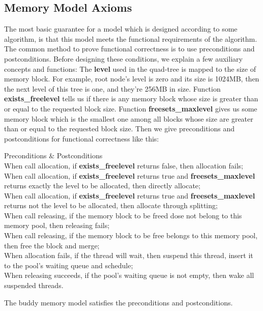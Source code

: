 \documentclass[runningheads]{llncs}
\begin{document}
\subsection{Memory Model Axioms}
The most basic guarantee for a model which is designed according to some algorithm, is that this model meets the functional requirements of the algorithm. The common method to prove functional correctness is to use preconditions and postconditions. Before designing these conditions, we explain a few auxiliary concepts and functions: The \textbf{level} used in the quad-tree is mapped to the size of memory block. For example, root node's level is zero and its size is 1024MB, then the next level of this tree is one, and they're 256MB in size. Function \textbf{exists\_freelevel} tells us if there is any memory block whose size is greater than or equal to the requested block size. Function \textbf{freesets\_maxlevel} gives us some memory block which is the smallest one among all blocks whose size are greater than or equal to the requested block size. Then we give preconditions and postconditions for functional correctness like this:

\begin{definition} {Preconditions $\&$ Postconditions} \\
When call allocation, if \textbf{exists\_freelevel} returns false, then allocation fails; \\
When call allocation, if \textbf{exists\_freelevel} returns true and \textbf{freesets\_maxlevel} returns exactly the level to be allocated, then directly allocate; \\
When call allocation, if \textbf{exists\_freelevel} returns true and \textbf{freesets\_maxlevel} returns not the level to be allocated, then allocate through splitting; \\
When call releasing, if the memory block to be freed dose not belong to this memory pool, then releasing fails; \\
When call releasing, if the memory block to be free belongs to this memory pool, then free the block and merge; \\
When allocation fails, if the thread will wait, then suspend this thread, insert it to the pool's waiting queue and schedule; \\
When releasing succeeds, if the pool's waiting queue is not empty, then wake all suspended threads.
\end{definition}

\begin{theorem}
The buddy memory model satisfies the preconditions and postconditions.
\end{theorem}
\end{document}
